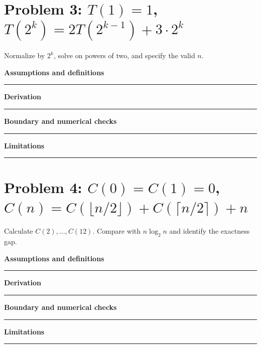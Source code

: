 \documentclass[11pt]{article}
\begin{document}
\section{\texorpdfstring{Problem 3: $T(1)=1$, $T(2^k)=2T(2^{k-1})+3\cdot 2^k$}{Problem 3: Divide-and-conquer recurrence on powers of two}}
Normalize by $2^k$, solve on powers of two, and specify the valid $n$.\par\medskip
\textbf{Assumptions and definitions}\par\vspace{0.7cm}\hrule\vspace{0.35cm}
\textbf{Derivation}\par\vspace{2.1cm}\hrule\vspace{0.3cm}
\textbf{Boundary and numerical checks}\par\vspace{1.1cm}\hrule\vspace{0.35cm}
\textbf{Limitations}\par\vspace{0.9cm}\hrule\vspace{0.35cm}
\section{\texorpdfstring{Problem 4: $C(0)=C(1)=0$, $C(n)=C(\lfloor n/2\rfloor)+C(\lceil n/2\rceil)+n$}{Problem 4: Floor-and-ceiling divide-and-conquer recurrence}}
Calculate $C(2),\ldots,C(12)$. Compare with $n\log_2n$ and identify the exactness gap.\par\medskip
\textbf{Assumptions and definitions}\par\vspace{0.7cm}\hrule\vspace{0.35cm}
\textbf{Derivation}\par\vspace{2.1cm}\hrule\vspace{0.3cm}
\textbf{Boundary and numerical checks}\par\vspace{1.1cm}\hrule\vspace{0.35cm}
\textbf{Limitations}\par\vspace{0.9cm}\hrule\vspace{0.35cm}
\end{document}
